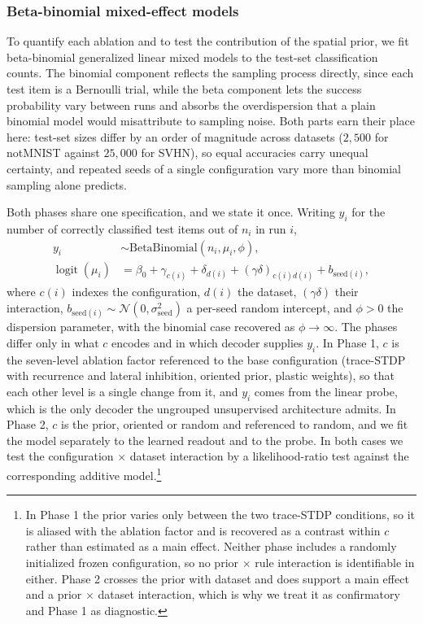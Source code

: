 \subsubsection{Beta-binomial mixed-effect models}

To quantify each ablation and to test the contribution of the spatial prior, we fit
beta-binomial generalized linear mixed models to the test-set classification counts. The
binomial component reflects the sampling process directly, since each test item is a
Bernoulli trial, while the beta component lets the success probability vary between runs
and absorbs the overdispersion that a plain binomial model would misattribute to sampling
noise. Both parts earn their place here: test-set sizes differ by an order of magnitude
across datasets ($2{,}500$ for notMNIST against $25{,}000$ for SVHN), so equal accuracies
carry unequal certainty, and repeated seeds of a single configuration vary more than
binomial sampling alone predicts.

Both phases share one specification, and we state it once. Writing $y_i$ for the number of
correctly classified test items out of $n_i$ in run $i$,
\begin{align}
y_i &\sim \mathrm{BetaBinomial}\!\left(n_i, \mu_i, \phi\right), \\
\operatorname{logit}\!\left(\mu_i\right)
&= \beta_0 + \gamma_{c(i)} + \delta_{d(i)} + (\gamma\delta)_{c(i)d(i)}
   + b_{\mathrm{seed}(i)},
\end{align}
where $c(i)$ indexes the configuration, $d(i)$ the dataset, $(\gamma\delta)$ their
interaction, $b_{\mathrm{seed}(i)} \sim \mathcal{N}(0, \sigma^2_{\mathrm{seed}})$ a
per-seed random intercept, and $\phi > 0$ the dispersion parameter, with the binomial case
recovered as $\phi \to \infty$. The phases differ only in what $c$ encodes and in which
decoder supplies $y_i$. In Phase 1, $c$ is the seven-level ablation factor referenced to
the base configuration (trace-STDP with recurrence and lateral inhibition, oriented prior,
plastic weights), so that each other level is a single change from it, and $y_i$ comes
from the linear probe, which is the only decoder
the ungrouped unsupervised architecture admits. In Phase 2, $c$ is the prior, oriented or
random and referenced to random, and we fit the model separately to the learned readout and
to the probe. In both cases we test the configuration $\times$ dataset interaction by a
likelihood-ratio test against the corresponding additive model.\footnote{In Phase 1 the prior varies only between the two trace-STDP conditions, so it
is aliased with the ablation factor and is recovered as a contrast within $c$ rather than
estimated as a main effect. Neither phase includes a randomly initialized frozen
configuration, so no prior $\times$ rule interaction is identifiable in either. Phase 2
crosses the prior with dataset and does support a main effect and a prior $\times$ dataset
interaction, which is why we treat it as confirmatory and Phase 1 as diagnostic.}
